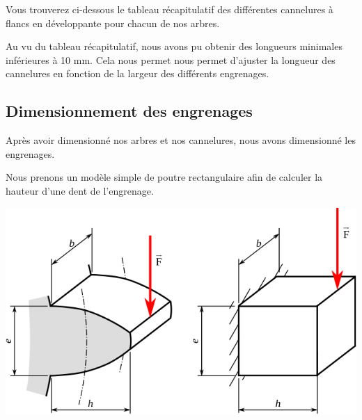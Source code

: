 \documentclass{config}
\begin{document}
\begin{spacing}{1.2}
Vous trouverez ci-dessous le tableau récapitulatif des différentes cannelures à flancs en développante pour chacun de nos arbres.

\begin{table}[h]
\centering
{}
\end{table}

Au vu du tableau récapitulatif, nous avons pu obtenir des longueurs minimales inférieures à 10 mm. Cela nous permet nous permet d'ajuster la longueur des cannelures en fonction de la largeur des différents engrenages. 

\newpage
\subsection{Dimensionnement des engrenages}

Après avoir dimensionné nos arbres et nos cannelures, nous avons dimensionné les engrenages.

Nous prenons un modèle simple de poutre rectangulaire afin de calculer la hauteur d'une dent de l'engrenage.

\begin{center}
\includegraphics[scale=0.6]{Flexion_dent_engrenage_modele_lewis.png}
\end{center}


\end{spacing}
\end{document}
